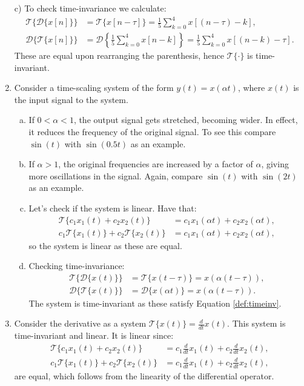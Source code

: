 \begin{enumerate}
\item[c)] To check time-invariance we calculate:
\begin{align*}
    \mathcal{T}\{\mathcal{D}\{x[n]\}\}&=\mathcal{T}\{x[n-\tau]\}=\frac{1}{5}\sum_{k=0}^{4}x[(n-\tau)-k], \\
    \mathcal{D}\{\mathcal{T}\{x[n]\}\}&=\mathcal{D}\left\{\frac{1}{5}\sum_{k=0}^{4}x[n-k]\right\}=\frac{1}{5}\sum_{k=0}^{4}x[(n-k)-\tau].
\end{align*}
These are equal upon rearranging the parenthesis, hence $\mathcal{T}\{\cdot\}$ is time-invariant. 

\item Consider a time-scaling system of the form $y(t)=x(\alpha t)$, where $x(t)$ is the input signal to the system. 

\begin{enumerate}[a)]
\item If $0<\alpha<1$, the output signal gets stretched, becoming wider. In effect, it reduces the frequency of the original signal. 
To see this compare $\sin(t)$ with $\sin(0.5t)$ as an example. 

\item If $\alpha>1$, the original frequencies are increased by a factor of $\alpha$, giving more oscillations in the signal. 
Again, compare $\sin(t)$ with $\sin(2t)$ as an example.

\item Let's check if the system is linear. Have that:
\begin{align*}
    \mathcal{T}\{c_{1}x_{1}(t)+c_{2}x_{2}(t)\}&= c_{1}x_{1}(\alpha t) + c_{2}x_{2}(\alpha t), \\
    c_{1}\mathcal{T}\{x_{1}(t)\}+c_{2}\mathcal{T}\{x_{2}(t)\}&=c_{1}x_{1}(\alpha t)+c_{2}x_{2}(\alpha t),
\end{align*}
so the system is linear as these are equal.

\item Checking time-invariance:
\begin{align*}
    \mathcal{T}\{\mathcal{D}\{x(t)\}\}&=\mathcal{T}\{x(t-\tau)\}=x(\alpha(t-\tau)), \\
    \mathcal{D}\{\mathcal{T}\{x(t)\}\}&=\mathcal{D}\{x(\alpha t)\}=x(\alpha(t-\tau)).
\end{align*}
The system is time-invariant as these satisfy Equation \ref{def:timeinv}.
\end{enumerate}

\item Consider the derivative as a system $\mathcal{T}\{x(t)\}=\frac{d}{dt}x(t)$. 
This system is time-invariant and linear. It is linear since:
\begin{align*}
    \mathcal{T}\{c_{1}x_{1}(t)+c_{2}x_{2}(t)\}&=c_{1}\frac{d}{dt}x_{1}(t) + c_{2}\frac{d}{dt}x_{2}(t), \\
    c_{1}\mathcal{T}\{x_{1}(t)\}+c_{2}\mathcal{T}\{x_{2}(t)\}&=c_{1}\frac{d}{dt}x_{1}(t) + c_{2}\frac{d}{dt}x_{2}(t),
\end{align*}
are equal, which follows from the linearity of the differential operator.


\end{enumerate}
